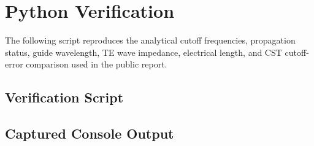 \chapter{Python Verification}
\label{app:python-verification}

The following script reproduces the analytical cutoff frequencies, propagation status, guide wavelength, TE wave impedance, electrical length, and CST cutoff-error comparison used in the public report.

\section{Verification Script}



\section{Captured Console Output}


